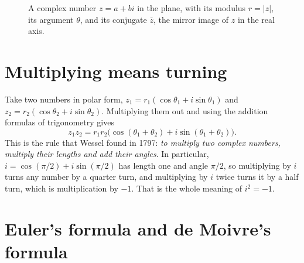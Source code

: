 \begin{figure}[tb]
\myfloatalign
{}
\caption[A complex number in the plane]{A complex number $z = a + bi$ in the plane, with its modulus $r = |z|$, its argument $\theta$, and its conjugate $\bar{z}$, the mirror image of $z$ in the real axis.}
\label{fig:complex-plane}
\end{figure}

\section{Multiplying means turning}\label{app:c-turning}

Take two numbers in polar form, $z_1 = r_1(\cos\theta_1 + i\sin\theta_1)$ and $z_2 = r_2(\cos\theta_2 + i\sin\theta_2)$. Multiplying them out and using the addition formulas of trigonometry gives
\[
z_1 z_2 = r_1 r_2 \bigl(\cos(\theta_1 + \theta_2) + i\sin(\theta_1 + \theta_2)\bigr).
\]
This is the rule that Wessel found in 1797: \emph{to multiply two complex numbers, multiply their lengths and add their angles}. In particular, $i = \cos(\pi/2) + i\sin(\pi/2)$ has length one and angle $\pi/2$, so multiplying by $i$ turns any number by a quarter turn, and multiplying by $i$ twice turns it by a half turn, which is multiplication by $-1$. That is the whole meaning of $i^2 = -1$.

\section{Euler's formula and de Moivre's formula}\label{app:c-euler}

